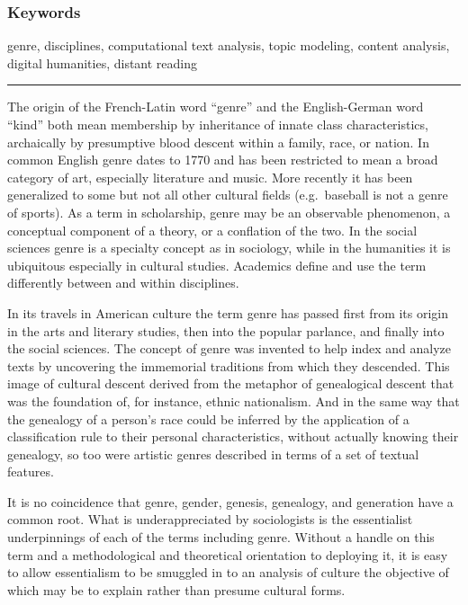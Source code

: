 \documentclass[]{book}
\theoremstyle{definition}
\theoremstyle{definition}
\theoremstyle{definition}
\theoremstyle{remark}
\begin{document}
\hypertarget{keywords-2}{%
\subsubsection*{Keywords}\label{keywords-2}}


genre, disciplines, computational text analysis, topic
modeling, content analysis, digital humanities, distant reading

\begin{center}\rule{0.5\linewidth}{\linethickness}\end{center}

The origin of the French-Latin word ``genre'' and the English-German
word ``kind'' both mean membership by inheritance of innate class
characteristics, archaically by presumptive blood descent within a
family, race, or nation. In common English genre dates to 1770 and has
been restricted to mean a broad category of art, especially literature
and music. More recently it has been generalized to some but not all
other cultural fields (e.g.~baseball is not a genre of sports). As a
term in scholarship, genre may be an observable phenomenon, a conceptual
component of a theory, or a conflation of the two. In the social
sciences genre is a specialty concept as in sociology, while in the
humanities it is ubiquitous especially in cultural studies. Academics
define and use the term differently between and within disciplines.

In its travels in American culture the term genre has passed first from
its origin in the arts and literary studies, then into the popular
parlance, and finally into the social sciences. The concept of genre was
invented to help index and analyze texts by uncovering the immemorial
traditions from which they descended. This image of cultural descent
derived from the metaphor of genealogical descent that was the
foundation of, for instance, ethnic nationalism. And in the same way
that the genealogy of a person's race could be inferred by the
application of a classification rule to their personal characteristics,
without actually knowing their genealogy, so too were artistic genres
described in terms of a set of textual features.

It is no coincidence that genre, gender, genesis, genealogy, and
generation have a common root. What is underappreciated by sociologists
is the essentialist underpinnings of each of the terms including genre.
Without a handle on this term and a methodological and theoretical
orientation to deploying it, it is easy to allow essentialism to be
smuggled in to an analysis of culture the objective of which may be to
explain rather than presume cultural forms.
\end{document}
